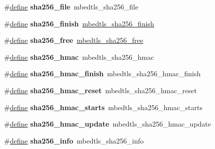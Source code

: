 \begin{DoxyCompactItemize}
\#\hyperlink{structdefine}{define} {\bfseries sha256\+\_\+file}~mbedtls\+\_\+sha256\+\_\+file
\item 
\mbox{\label{compat-1_83_8h_a8a6d430b0d282cdbb0952f8caa4f8c2d}} 
\#\hyperlink{structdefine}{define} {\bfseries sha256\+\_\+finish}~\hyperlink{sha256_8h_a4df33c27996551f5af780b7710490c9b}{mbedtls\+\_\+sha256\+\_\+finish}
\item 
\mbox{\label{compat-1_83_8h_a54d22b8dff1b2d0407655e26327a7221}} 
\#\hyperlink{structdefine}{define} {\bfseries sha256\+\_\+free}~\hyperlink{sha256_8h_a6b9b9823b990de9685820fe59f1d9e1d}{mbedtls\+\_\+sha256\+\_\+free}
\item 
\mbox{\label{compat-1_83_8h_a54fc1329565ec8991029f4b7e8033580}} 
\#\hyperlink{structdefine}{define} {\bfseries sha256\+\_\+hmac}~mbedtls\+\_\+sha256\+\_\+hmac
\item 
\mbox{\label{compat-1_83_8h_af1f26ddd60b2c8696cf316ca8fc8462a}} 
\#\hyperlink{structdefine}{define} {\bfseries sha256\+\_\+hmac\+\_\+finish}~mbedtls\+\_\+sha256\+\_\+hmac\+\_\+finish
\item 
\mbox{\label{compat-1_83_8h_a28edf19ac50a97e64ccbe834544eddaf}} 
\#\hyperlink{structdefine}{define} {\bfseries sha256\+\_\+hmac\+\_\+reset}~mbedtls\+\_\+sha256\+\_\+hmac\+\_\+reset
\item 
\mbox{\label{compat-1_83_8h_a8f659f8c0434e631604de4de44559984}} 
\#\hyperlink{structdefine}{define} {\bfseries sha256\+\_\+hmac\+\_\+starts}~mbedtls\+\_\+sha256\+\_\+hmac\+\_\+starts
\item 
\mbox{\label{compat-1_83_8h_a5e89021c26dbeaa49b5e8947e4bd364a}} 
\#\hyperlink{structdefine}{define} {\bfseries sha256\+\_\+hmac\+\_\+update}~mbedtls\+\_\+sha256\+\_\+hmac\+\_\+update
\item 
\mbox{\label{compat-1_83_8h_a2166437e69e9a40649fcab07f215abb2}} 
\#\hyperlink{structdefine}{define} {\bfseries sha256\+\_\+info}~mbedtls\+\_\+sha256\+\_\+info
\item 
\mbox{\label{compat-1_83_8h_a509e59da6cfc7c14458d5a26e7a38c96}} 

\end{DoxyCompactItemize}
